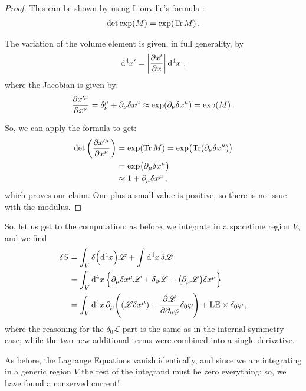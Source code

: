\documentclass[main.tex]{subfiles}
\begin{document}
\begin{proof}
This can be shown by using Liouville's formula \cite[eq. 4.9]{winitzkiLinearAlgebraExterior2010}:
%
\begin{align}
\det \exp(M) = \exp(\Tr M)
\,.
\end{align}

The variation of the volume element is given, in full generality, by 
%
\begin{align}
\dd[4]{x'} = \abs{ \pdv{x'}{x}} \dd[4]{x}
\,,
\end{align}
%
where the Jacobian is given by:
%
\begin{align}
\pdv{x^{\prime \mu }}{x^{\nu }} = \delta^{\mu }_{\nu } + \partial_{\nu } \delta x^{\mu } \approx \exp( \partial_{\nu } \delta x^{\mu }) = \exp(M)
\,.
\end{align}

So, we can apply the formula to get: 
%
\begin{align}
\det \qty(\pdv{x^{\prime \mu }}{x^{\nu }}) &= \exp(\Tr M)
= \exp(\Tr(\partial_{\nu } \delta x^{\mu }))   \\
&= \exp( \partial_{\mu } \delta x^{\mu })  \\
&\approx 1 + \partial_{\mu } \delta x^{\mu }
\,,
\end{align}
%
which proves our claim. One plus a small value is positive, so there is no issue with the modulus. 
\end{proof}

So, let us get to the computation: as before, we integrate in a spacetime region \(V\), and we find 
%
\begin{align}
\delta S &= \int_{V} \delta \qty(\dd[4]{x}) \mathscr{L} + \int \dd[4]{x} \delta \mathscr{L}  \\
&= \int_V \dd[4]{x} \qty{ \partial_{\mu } \delta x^{\mu } \mathscr{L} + 
\delta_{0} \mathscr{L} + \qty(\partial_{\mu } \mathscr{L}) \delta x^{\mu}
}  \\
&= \int_V \dd[4]{x}  \partial_{\mu } \qty(\qty(\mathscr{L} \delta x^{\mu }) + \pdv{\mathscr{L}}{\partial_{\mu } \varphi } \delta_0  \varphi )
+ \text{LE} \times \delta_0 \varphi  
\,,
\end{align}
%
where the reasoning for the \(\delta_0 \mathscr{L}\) part is the same as in the internal symmetry case; while the two new additional terms were combined into a single derivative. 

As before, the Lagrange Equations vanish identically, and since we are integrating in a generic region \(V\) the rest of the integrand must be zero everything: so, we have found a conserved current! 
\end{document}
